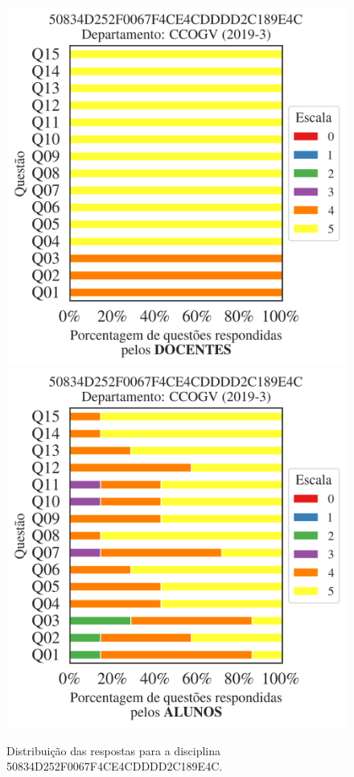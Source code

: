 \documentclass[a4paper,10pt]{article}
\begin{document}
\begin{figure}[h]
\centering
\includegraphics[width=0.485\linewidth]{analise_disciplina_departamento_CCOGV_50834D252F0067F4CE4CDDDD2C189E4C_docentes.png}
\includegraphics[width=0.485\linewidth]{analise_disciplina_departamento_CCOGV_50834D252F0067F4CE4CDDDD2C189E4C_alunos.png}
\caption{\label{fig:analise_geral_departamento}                Distribuição das respostas para a disciplina 50834D252F0067F4CE4CDDDD2C189E4C. }
\end{figure}
\end{document}
